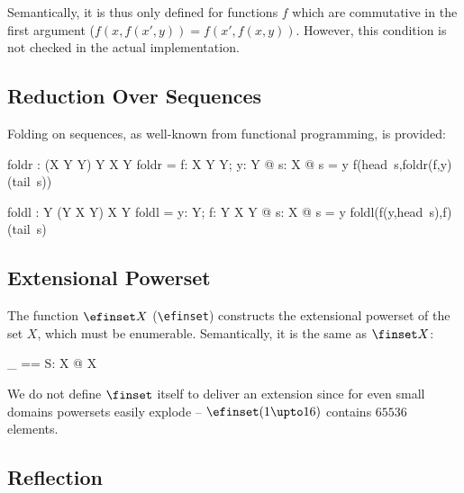 \documentclass{article}
\begin{document}
Semantically, it is thus only defined for functions $f$ which are
commutative in the first argument ($f(x,f(x',y)) =
f(x',f(x,y))$. However, this condition is not checked in the actual
implementation.

\subsection{Reduction Over Sequences}

Folding on sequences, as well-known from functional
programming, is provided:

\begin{axdef}[X,Y]
  foldr : (X \cross Y \pfun Y) \cross Y  \fun \seq X \pfun Y
\where
  foldr = \lambda f: X \cross Y \pfun Y; y: Y @
           \lambda s: \seq X @
              \IF s = \langle\rangle \THEN y 
              \ELSE f(head~s,foldr(f,y)(tail~s))
\end{axdef}

\begin{axdef}[X,Y]
  foldl : Y \cross (Y \cross X \pfun Y) \fun \seq X \pfun Y
\where
  foldl = \lambda y: Y; f: Y \cross X \pfun Y @
           \lambda s: \seq X @
              \IF s = \langle\rangle \THEN y 
              \ELSE foldl(f(y,head~s),f)(tail~s)
\end{axdef}



\subsection{Extensional Powerset}

The function $\efinset X$ (\verb:\efinset:) constructs the
extensional powerset of the set $X$, which must be enumerable.
Semantically, it is the same as $\finset X$:

\begin{zedgroup}
\begin{zdirectives}
\end{zdirectives}
\begin{axdef}[X]
  \efinset \_ == \lambda S: \power X @ \finset X
\end{axdef}
\end{zedgroup}

We do not define $\finset$ itself to deliver an extension since for
even small domains powersets easily explode -- $\efinset
(1 \upto 16)$ contains $65536$ elements.


\subsection{Reflection}
\end{document}
